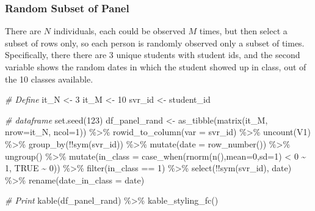 \documentclass[
]{book}
\newenvironment{Shaded}{\begin{snugshade}}{\end{snugshade}}
\newcommand{\AttributeTok}[1]{\textcolor[rgb]{0.77,0.63,0.00}{#1}}
\newcommand{\CommentTok}[1]{\textcolor[rgb]{0.56,0.35,0.01}{\textit{#1}}}
\newcommand{\ConstantTok}[1]{\textcolor[rgb]{0.00,0.00,0.00}{#1}}
\newcommand{\DecValTok}[1]{\textcolor[rgb]{0.00,0.00,0.81}{#1}}
\newcommand{\FunctionTok}[1]{\textcolor[rgb]{0.00,0.00,0.00}{#1}}
\newcommand{\NormalTok}[1]{#1}
\newcommand{\OtherTok}[1]{\textcolor[rgb]{0.56,0.35,0.01}{#1}}
\newcommand{\SpecialCharTok}[1]{\textcolor[rgb]{0.00,0.00,0.00}{#1}}
\newcommand{\StringTok}[1]{\textcolor[rgb]{0.31,0.60,0.02}{#1}}
\begin{document}
\hypertarget{random-subset-of-panel}{%
\subsubsection{Random Subset of Panel}\label{random-subset-of-panel}}

There are \(N\) individuals, each could be observed \(M\) times, but then select a subset of rows only, so each person is randomly observed only a subset of times. Specifically, there there are 3 unique students with student ids, and the second variable shows the random dates in which the student showed up in class, out of the 10 classes available.

\begin{Shaded}
\begin{Highlighting}[]
\CommentTok{\# Define}
\NormalTok{it\_N }\OtherTok{\textless{}{-}} \DecValTok{3}
\NormalTok{it\_M }\OtherTok{\textless{}{-}} \DecValTok{10}
\NormalTok{svr\_id }\OtherTok{\textless{}{-}} \StringTok{\textquotesingle{}student\_id\textquotesingle{}}

\CommentTok{\# dataframe}
\FunctionTok{set.seed}\NormalTok{(}\DecValTok{123}\NormalTok{)}
\NormalTok{df\_panel\_rand }\OtherTok{\textless{}{-}} \FunctionTok{as\_tibble}\NormalTok{(}\FunctionTok{matrix}\NormalTok{(it\_M, }\AttributeTok{nrow=}\NormalTok{it\_N, }\AttributeTok{ncol=}\DecValTok{1}\NormalTok{)) }\SpecialCharTok{\%\textgreater{}\%}
  \FunctionTok{rowid\_to\_column}\NormalTok{(}\AttributeTok{var =}\NormalTok{ svr\_id) }\SpecialCharTok{\%\textgreater{}\%}
  \FunctionTok{uncount}\NormalTok{(V1) }\SpecialCharTok{\%\textgreater{}\%}
  \FunctionTok{group\_by}\NormalTok{(}\SpecialCharTok{!!}\FunctionTok{sym}\NormalTok{(svr\_id)) }\SpecialCharTok{\%\textgreater{}\%} \FunctionTok{mutate}\NormalTok{(}\AttributeTok{date =} \FunctionTok{row\_number}\NormalTok{()) }\SpecialCharTok{\%\textgreater{}\%}
  \FunctionTok{ungroup}\NormalTok{() }\SpecialCharTok{\%\textgreater{}\%} \FunctionTok{mutate}\NormalTok{(}\AttributeTok{in\_class =} \FunctionTok{case\_when}\NormalTok{(}\FunctionTok{rnorm}\NormalTok{(}\FunctionTok{n}\NormalTok{(),}\AttributeTok{mean=}\DecValTok{0}\NormalTok{,}\AttributeTok{sd=}\DecValTok{1}\NormalTok{) }\SpecialCharTok{\textless{}} \DecValTok{0} \SpecialCharTok{\textasciitilde{}} \DecValTok{1}\NormalTok{, }\ConstantTok{TRUE} \SpecialCharTok{\textasciitilde{}} \DecValTok{0}\NormalTok{)) }\SpecialCharTok{\%\textgreater{}\%}
  \FunctionTok{filter}\NormalTok{(in\_class }\SpecialCharTok{==} \DecValTok{1}\NormalTok{) }\SpecialCharTok{\%\textgreater{}\%} \FunctionTok{select}\NormalTok{(}\SpecialCharTok{!!}\FunctionTok{sym}\NormalTok{(svr\_id), date) }\SpecialCharTok{\%\textgreater{}\%}
  \FunctionTok{rename}\NormalTok{(}\AttributeTok{date\_in\_class =}\NormalTok{ date)}

\CommentTok{\# Print}
\FunctionTok{kable}\NormalTok{(df\_panel\_rand) }\SpecialCharTok{\%\textgreater{}\%} \FunctionTok{kable\_styling\_fc}\NormalTok{()}
\end{Highlighting}
\end{Shaded}
\end{document}
